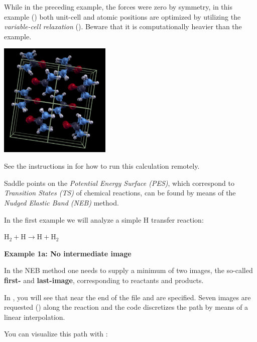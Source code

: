 \documentclass[landscape]{foils}
\begin{document}

While in the preceding example, the forces were zero by symmetry, in
this example () both unit-cell and atomic
positions are optimized by utilizing the {\em variable-cell
  relaxation} ().  Beware that it is
computationally heavier than the  example.
\begin{center}
  \includegraphics[width=0.4\textwidth]{figs/urea.png}
\end{center}
See the instructions in  for how to run this
calculation remotely.

%
Saddle points on the {\em Potential Energy Surface (PES)}, which
correspond to {\em Transition States (TS)} of chemical reactions, can
be found by means of the {\em Nudged Elastic Band (NEB)} method.

In the first example we will analyze a simple H transfer reaction:
\begin{center}
{\large $\mathrm{H_2 + H \rightarrow H + H_2}$}
\end{center}
{\bf Example 1a: No intermediate image}

In the NEB method one needs to supply a minimum of two images, the
so-called {\bf first-} and {\bf last-image}, corresponding to
reactants and products.

In , you will see that near the end of the file
 and  are specified. Seven
images are requested () along the
reaction and the  code discretizes the path
by means of a linear interpolation.

You can visualize this path with :
\end{document}
